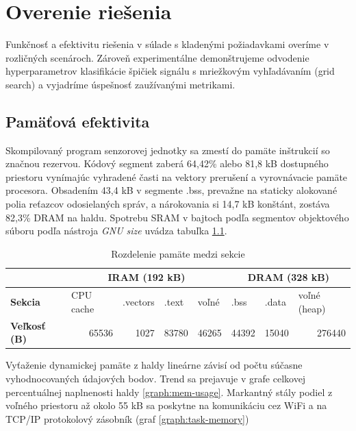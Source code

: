 \chapter{Overenie riešenia}
Funkčnosť a efektivitu riešenia v súlade s kladenými požiadavkami overíme v rozličných scenároch. Zároveň experimentálne
demonštrujeme odvodenie hyperparametrov klasifikácie špičiek signálu s mriežkovým vyhľadávaním (grid search)
a vyjadríme úspešnosť zaužívanými metrikami.

\section{Pamäťová efektivita}
Skompilovaný program senzorovej jednotky sa zmestí do pamäte inštrukcií so značnou rezervou. Kódový segment zaberá
64,42\% alebo 81,8 kB dostupného priestoru vynímajúc vyhradené časti na vektory prerušení a vyrovnávacie pamäte procesora.
Obsadením 43,4 kB v segmente .bss, prevažne na staticky alokované polia reťazcov odosielaných správ, a nárokovania si 14,7 kB
konštánt, zostáva 82,3\% DRAM na haldu. Spotrebu SRAM v bajtoch podľa segmentov objektového súboru podľa nástroja
\emph{GNU size} uvádza tabuľka \ref{tab:ram-segments}.
\begin{table}[h]
\def\arraystretch{1.25}
\begin{tabular}{|l|llll|lll|}
\hline
                     & \multicolumn{4}{c|}{\textbf{IRAM (192 kB)}}                                                                              & \multicolumn{3}{c|}{\textbf{DRAM (328 kB)}}                                           \\ \hline
\textbf{Sekcia}      & \multicolumn{1}{l|}{CPU cache} & \multicolumn{1}{l|}{.vectors} & \multicolumn{1}{l|}{.text} & voľné                      & \multicolumn{1}{l|}{.bss}  & \multicolumn{1}{l|}{.data} & voľné (heap)                \\ \hline
\textbf{Veľkosť (B)} & \multicolumn{1}{r|}{65536}     & \multicolumn{1}{r|}{1027}     & \multicolumn{1}{r|}{83780} & \multicolumn{1}{r|}{46265} & \multicolumn{1}{r|}{44392} & \multicolumn{1}{r|}{15040} & \multicolumn{1}{r|}{276440} \\ \hline
\end{tabular}
\caption{Rozdelenie pamäte medzi sekcie}
\label{tab:ram-segments}
\end{table}

Vyťaženie dynamickej pamäte z haldy lineárne závisí od počtu súčasne vyhodnocovaných údajových bodov. Trend sa prejavuje v grafe
celkovej percentuálnej naplnenosti haldy \ref{graph:mem-usage}. Markantný stály podiel z voľného priestoru až okolo 55 kB sa poskytne na komunikáciu cez WiFi a na TCP/IP protokolový zásobník (graf \ref{graph:task-memory})

